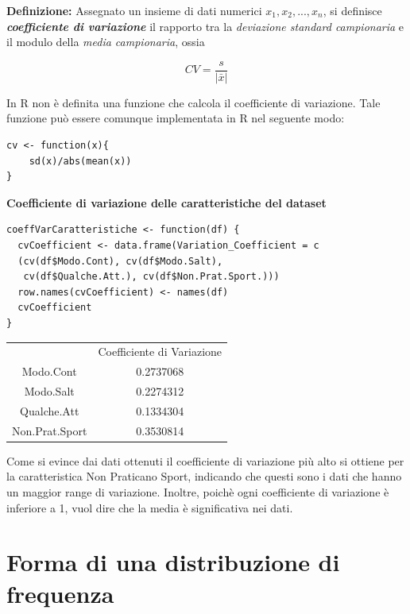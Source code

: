 \noindent \textbf{Definizione:} Assegnato un insieme di dati numerici $x_1, x_2, ..., x_n$, si definisce \textbf{\textit{coefficiente di variazione}} il rapporto tra la \textit{deviazione standard campionaria} e il modulo della \textit{media campionaria}, ossia

\[CV = \frac{s}{|\bar x|}\]

In R non è definita una funzione che calcola il coefficiente di variazione. Tale funzione può essere comunque implementata in R nel seguente modo:

\vspace{5mm}
\begin{lstlisting}
cv <- function(x){
    sd(x)/abs(mean(x))
}
\end{lstlisting}
\vspace{5mm}

\noindent \textbf{Coefficiente di variazione delle caratteristiche del dataset}

\vspace{5mm}
\begin{lstlisting}
coeffVarCaratteristiche <- function(df) {
  cvCoefficient <- data.frame(Variation_Coefficient = c
  (cv(df$Modo.Cont), cv(df$Modo.Salt),
   cv(df$Qualche.Att.), cv(df$Non.Prat.Sport.)))
  row.names(cvCoefficient) <- names(df)
  cvCoefficient
}
\end{lstlisting}
\vspace{5mm}

\vspace{5mm}
\begin{tabular}{ c c}
  & Coefficiente di Variazione\\
 Modo.Cont & 0.2737068\\ 
 Modo.Salt & 0.2274312\\
 Qualche.Att & 0.1334304\\ 
 Non.Prat.Sport & 0.3530814\\ 
\end{tabular}
\vspace{5mm}

Come si evince dai dati ottenuti il coefficiente di variazione più alto si ottiene per la caratteristica Non Praticano Sport, indicando che questi sono i dati che hanno un maggior range di variazione. Inoltre, poichè ogni coefficiente di variazione è inferiore a 1, vuol dire che la media è significativa nei dati.

\section{Forma di una distribuzione di frequenza}\label{cap3.3}

